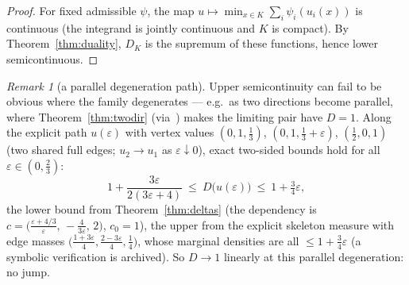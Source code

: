\documentclass{aims}
\numberwithin{equation}{section}
\theoremstyle{plain}
\theoremstyle{definition}
\theoremstyle{remark}
\newtheorem{remark}[theorem]{Remark}
\begin{document}
\begin{proof}
For fixed admissible $\psi$, the map
$u\mapsto\min_{x\in K}\sum_i\psi_i(u_i(x))$ is continuous (the integrand is
jointly continuous and $K$ is compact). By Theorem~\ref{thm:duality},
$D_K$ is the supremum of these functions, hence lower semicontinuous.
\end{proof}

\begin{remark}[a parallel degeneration path]\label{rem:parallelpath}
Upper semicontinuity can fail to be obvious where the family degenerates ---
e.g.\ as two directions become parallel, where Theorem~\ref{thm:twodir}
(via~\cite{Gardner88}) makes the limiting pair have $D=1$. Along the
explicit path $u(\varepsilon)$ with vertex values $(0,1,\tfrac13)$,
$(0,1,\tfrac13+\varepsilon)$, $(\tfrac12,0,1)$ (two shared full edges;
$u_2\to u_1$ as $\varepsilon\downarrow0$), exact two-sided bounds hold for
all $\varepsilon\in(0,\tfrac23)$:
\[
1+\frac{3\varepsilon}{2(3\varepsilon+4)}\ \le\ D\bigl(u(\varepsilon)\bigr)
\ \le\ 1+\tfrac34\varepsilon ,
\]
the lower bound from Theorem~\ref{thm:deltas} (the dependency is
$c=\bigl(\frac{\varepsilon+4/3}\varepsilon,\,-\frac4{3\varepsilon},\,2\bigr)$,
$c_0=1$), the upper from the explicit skeleton measure with edge masses
$\bigl(\frac{1+3\varepsilon}4,\frac{2-3\varepsilon}4,\frac14\bigr)$, whose
marginal densities are all $\le1+\tfrac34\varepsilon$ (a symbolic
verification is archived). So $D\to1$ linearly at this parallel
degeneration: no jump.
\end{remark}
\end{document}
